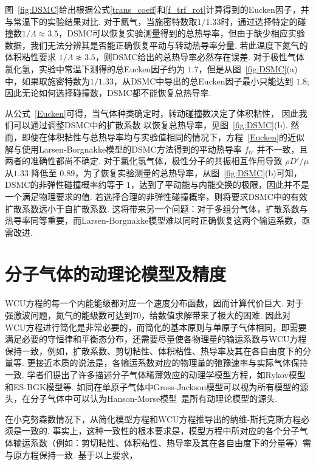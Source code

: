 图~\ref{fig:DSMC}给出根据公式\eqref{trans_coeff}和\eqref{f_trf_rot}计算得到的Eucken因子，并与常温下的实验结果对比.  对于氮气，当施密特数取$1/1.33$时，通过选择特定的碰撞数$1/\Lambda\approx3.5$，DSMC可以恢复实验测量得到的总热导率，但由于缺少相应实验数据，我们无法分辨其是否能正确恢复平动与转动热导率分量. 若此温度下氮气的体积粘性要求 $1/\Lambda\not\approx3.5$，则DSMC给出的总热导率必然存在误差. 对于极性气体氯化氢，实验中常温下测得的总Eucken因子约为 $1.7$，但是从图~\ref{fig:DSMC}(a) 中，如果取施密特数为$1/1.33$，从DSMC中导出的总Eucken因子最小只能达到 $1.8$; 因此无论如何选择碰撞数，DSMC都不能恢复总热导率. 



从公式~\eqref{Eucken}可得，当气体种类确定时，转动碰撞数决定了体积粘性， 因此我们可以通过调整DSMC中的扩散系数  以恢复总热导率，见图~\ref{fig:DSMC}(b).  然而，即便在体积粘性与总热导率均与实验值相同的情况下，方程~\eqref{Eucken}的近似解与使用Larsen-Borgnakke模型的DSMC方法得到的平动热导率 $f_{tr}$ 并不一致，且两者的准确性都尚不确定. 对于氯化氢气体，极性分子的共振相互作用\cite{mason1962heat}导致 $\rho{}D'/\mu$ 从$ 1.33 $ 降低至 $ 0.89$，为了恢复实验测量的总热导率，从图~\ref{fig:DSMC}(b)可知，DSMC的非弹性碰撞概率约等于 $ 1 $，达到了平动能与内能交换的极限，因此并不是一个满足物理要求的值.  若选择合理的非弹性碰撞概率，则将要求DSMC中的有效扩散系数远小于自扩散系数. 这将带来另一个问题：对于多组分气体，扩散系数与热导率同等重要，而Larsen-Borgnakke模型难以同时正确恢复这两个输运系数，亟需改进. 




\section{分子气体的动理论模型及精度}\label{Kinetic_model_poly}



WCU方程的每一个内能能级都对应一个速度分布函数，因而计算代价巨大. 对于强激波问题，氮气的能级数可达到70，给数值求解带来了极大的困难\cite{Tcheremissine2008AIP}. 因此对WCU方程进行简化是非常必要的，而简化的基本原则与单原子气体相同，即需要满足必要的守恒律和平衡态分布，还需要尽量使各物理量的输运系数与WCU方程保持一致，例如，扩散系数、剪切粘性、体积粘性、热导率及其在各自由度下的分量等. 更接近本质的说法是，各输运系数对应的物理量的弛豫速率与实际气体保持一致. 学者们提出了许多描述分子气体稀薄效应的动理学模型方程，如Rykov模型和ES-BGK模型等. 如同在单原子气体中Gross-Jackson模型可以视为所有模型的源头，在分子气体中可以认为Hanson-Morse模型~\cite{Hanson1967PoF}是所有动理论模型的源头.

在小克努森数情况下，从简化模型方程和WCU方程推导出的纳维-斯托克斯方程必须是一致的. 事实上，这种一致性的根本要求是，模型方程中所对应的各个分子气体输运系数（例如：剪切粘性、体积粘性、热导率及其在各自由度下的分量等）需与原方程保持一致. 基于以上要求，

